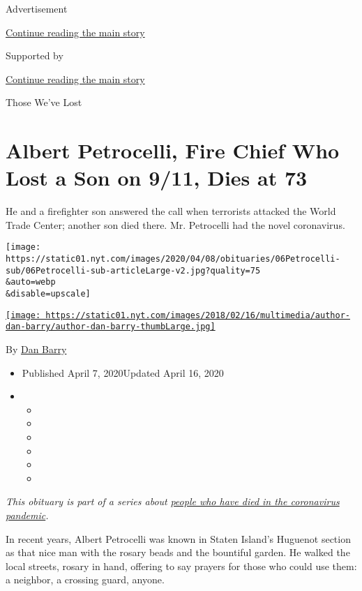 Advertisement

\protect\hyperlink{after-top}{Continue reading the main story}

Supported by

\protect\hyperlink{after-sponsor}{Continue reading the main story}

Those We've Lost

\hypertarget{albert-petrocelli-fire-chief-who-lost-a-son-on-911-dies-at-73}{%
\section{Albert Petrocelli, Fire Chief Who Lost a Son on 9/11, Dies at
73}\label{albert-petrocelli-fire-chief-who-lost-a-son-on-911-dies-at-73}}

He and a firefighter son answered the call when terrorists attacked the
World Trade Center; another son died there. Mr. Petrocelli had the novel
coronavirus.

\texttt{[image: https://static01.nyt.com/images/2020/04/08/obituaries/06Petrocelli-sub/06Petrocelli-sub-articleLarge-v2.jpg?quality=75\\\&auto=webp\\\&disable=upscale]}

\href{https://www.nytimes.com/by/dan-barry}{\texttt{[image: https://static01.nyt.com/images/2018/02/16/multimedia/author-dan-barry/author-dan-barry-thumbLarge.jpg]}}

By \href{https://www.nytimes.com/by/dan-barry}{Dan Barry}

\begin{itemize}
\item
  Published April 7, 2020Updated April 16, 2020
\item
  \begin{itemize}
  \item
  \item
  \item
  \item
  \item
  \item
  \end{itemize}
\end{itemize}

\emph{This obituary is part of a series about}
\href{https://www.nytimes.com/series/people-who-have-died-of-the-coronavirus}{\emph{people
who have died in the coronavirus pandemic}}\emph{.}

In recent years, Albert Petrocelli was known in Staten Island's Huguenot
section as that nice man with the rosary beads and the bountiful garden.
He walked the local streets, rosary in hand, offering to say prayers for
those who could use them: a neighbor, a crossing guard, anyone.

